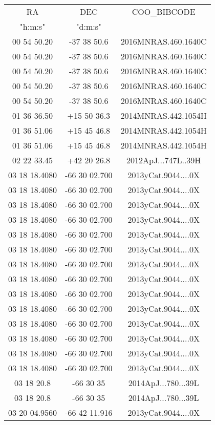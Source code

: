 \begin{table}
\begin{tabular}{ccc}
RA & DEC & COO_BIBCODE \\
"h:m:s" & "d:m:s" &  \\
00 54 50.20 & -37 38 50.6 & 2016MNRAS.460.1640C \\
00 54 50.20 & -37 38 50.6 & 2016MNRAS.460.1640C \\
00 54 50.20 & -37 38 50.6 & 2016MNRAS.460.1640C \\
00 54 50.20 & -37 38 50.6 & 2016MNRAS.460.1640C \\
00 54 50.20 & -37 38 50.6 & 2016MNRAS.460.1640C \\
01 36 36.50 & +15 50 36.3 & 2014MNRAS.442.1054H \\
01 36 51.06 & +15 45 46.8 & 2014MNRAS.442.1054H \\
01 36 51.06 & +15 45 46.8 & 2014MNRAS.442.1054H \\
02 22 33.45 & +42 20 26.8 & 2012ApJ...747L..39H \\
03 18 18.4080 & -66 30 02.700 & 2013yCat.9044....0X \\
03 18 18.4080 & -66 30 02.700 & 2013yCat.9044....0X \\
03 18 18.4080 & -66 30 02.700 & 2013yCat.9044....0X \\
03 18 18.4080 & -66 30 02.700 & 2013yCat.9044....0X \\
03 18 18.4080 & -66 30 02.700 & 2013yCat.9044....0X \\
03 18 18.4080 & -66 30 02.700 & 2013yCat.9044....0X \\
03 18 18.4080 & -66 30 02.700 & 2013yCat.9044....0X \\
03 18 18.4080 & -66 30 02.700 & 2013yCat.9044....0X \\
03 18 18.4080 & -66 30 02.700 & 2013yCat.9044....0X \\
03 18 18.4080 & -66 30 02.700 & 2013yCat.9044....0X \\
03 18 18.4080 & -66 30 02.700 & 2013yCat.9044....0X \\
03 18 18.4080 & -66 30 02.700 & 2013yCat.9044....0X \\
03 18 18.4080 & -66 30 02.700 & 2013yCat.9044....0X \\
03 18 18.4080 & -66 30 02.700 & 2013yCat.9044....0X \\
03 18 20.8 & -66 30 35 & 2014ApJ...780...39L \\
03 18 20.8 & -66 30 35 & 2014ApJ...780...39L \\
03 20 04.9560 & -66 42 11.916 & 2013yCat.9044....0X \\

\end{tabular}
\end{table}
